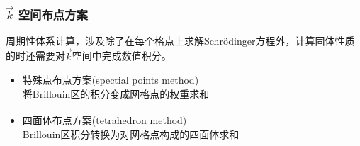 \documentclass[cjk,slidestop,compress,mathserif,blue]{beamer}
\newcommand{\upcite}[1]{\hspace{0ex}\textsuperscript{\cite{#1}}} %
\begin{document}
\frame
{
\frametitle{$\vec k$ 空间布点方案}
\vskip 10pt
周期性体系计算，涉及除了在每个格点上求解\textrm{Schr\"odinger}方程外，计算固体性质的时还需要对$\vec k$空间中完成数值积分。
\vskip 10pt
\begin{itemize}%
    \item 特殊点布点方案\textrm{(spectial points method)}\\
      将\textrm{Brillouin}区的积分变成网格点的权重求和
    \item 四面体布点方案\textrm{(tetrahedron method)}\upcite{PRB49-16233_1994}\\
	    \textrm{Brillouin}区积分转换为对网格点构成的四面体求和
\end{itemize}
\begin{figure}[h!]
\centering
\vspace*{-0.2in}
\end{figure}
}
\end{document}

